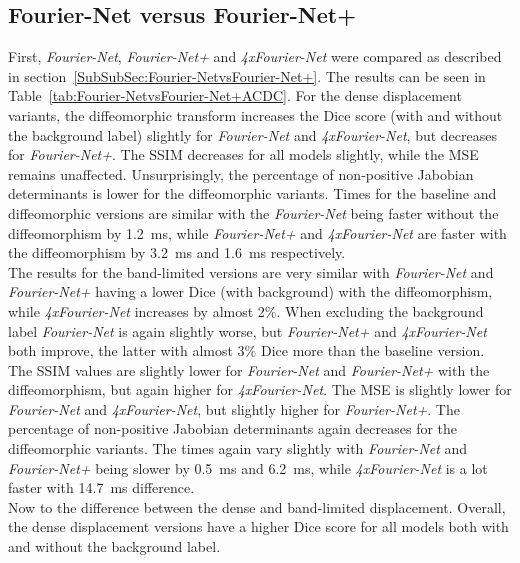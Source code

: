\subsection{Fourier-Net versus Fourier-Net+} \label{SubSec:ResultsFourier-NetvsFourier-Net+ACDC}
First, \emph{Fourier-Net}, \emph{Fourier-Net+} and \emph{4xFourier-Net} were compared as described in section~\ref{SubSubSec:Fourier-NetvsFourier-Net+}. The results can be seen in Table~\ref{tab:Fourier-NetvsFourier-Net+ACDC}. For the dense displacement variants, the diffeomorphic transform increases the Dice score (with and without the background label) slightly for \emph{Fourier-Net} and \emph{4xFourier-Net}, but decreases for \emph{Fourier-Net+}. The SSIM decreases for all models slightly, while the MSE remains unaffected. Unsurprisingly, the percentage of non-positive Jabobian determinants is lower for the diffeomorphic variants. Times for the baseline and diffeomorphic versions are similar with the \emph{Fourier-Net} being faster without the diffeomorphism by 1.2~ms, while \emph{Fourier-Net+} and \emph{4xFourier-Net} are faster with the diffeomorphism by 3.2~ms and 1.6~ms respectively. \\
The results for the band-limited versions are very similar with \emph{Fourier-Net} and \emph{Fourier-Net+} having a lower Dice (with background) with the diffeomorphism, while \emph{4xFourier-Net} increases by almost 2$\%$. When excluding the background label \emph{Fourier-Net} is again slightly worse, but \emph{Fourier-Net+} and \emph{4xFourier-Net} both improve, the latter with almost 3$\%$ Dice more than the baseline version. The SSIM values are slightly lower for \emph{Fourier-Net} and \emph{Fourier-Net+} with the diffeomorphism, but again higher for \emph{4xFourier-Net}. The MSE is slightly lower for \emph{Fourier-Net} and \emph{4xFourier-Net}, but slightly higher for \emph{Fourier-Net+}. The percentage of non-positive Jabobian determinants again decreases for the diffeomorphic variants. The times again vary slightly with \emph{Fourier-Net} and \emph{Fourier-Net+} being slower by 0.5~ms and 6.2~ms, while \emph{4xFourier-Net} is a lot faster with 14.7~ms difference.\\
Now to the difference between the dense and band-limited displacement. Overall, the dense displacement versions have a higher Dice score for all models both with and without the background label. 
